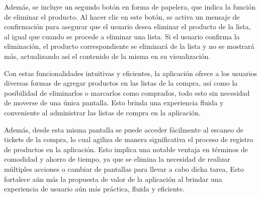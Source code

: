 \documentclass{article}
\begin{document}
Además, se incluye un segundo botón en forma de papelera, que indica la función de eliminar el producto. Al hacer clic en este botón, se activa un mensaje de confirmación para asegurar que el usuario desea eliminar el producto de la lista, al igual que cuando se procede a eliminar una lista. Si el usuario confirma la eliminación, el producto correspondiente se eliminará de la lista y no se mostrará más, actualizando así el contenido de la misma en su visualización.

Con estas funcionalidades intuitivas y eficientes, la aplicación ofrece a los usuarios diversas formas de agregar productos en las listas de la compra, así como la posibilidad de eliminarlos o marcarlos como comprados, todo esto sin necesidad de moverse de una única pantalla. Esto brinda una experiencia fluida y conveniente al administrar las listas de compra en la aplicación.

Además, desde esta misma pantalla se puede acceder fácilmente al escaneo de tickets de la compra, lo cual agiliza de manera significativa el proceso de registro de productos en la aplicación. Esto implica una notable ventaja en términos de comodidad y ahorro de tiempo, ya que se elimina la necesidad de realizar múltiples acciones o cambiar de pantallas para llevar a cabo dicha tarea, Esto fortalece aún más la propuesta de valor de la aplicación al brindar una experiencia de usuario aún más práctica, fluida y eficiente.
\end{document}
